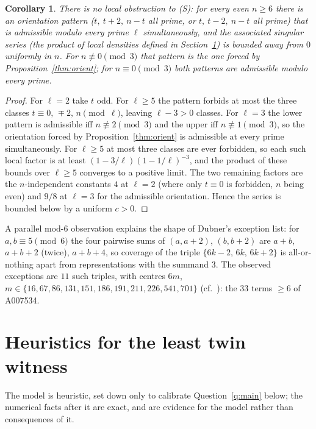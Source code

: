 \documentclass[10pt]{article}
\newtheorem{corollary}{Corollary}
\theoremstyle{definition}
\theoremstyle{remark}
\begin{document}
\begin{corollary}\label{cor:local}
There is no local obstruction to (S): for every even $n \ge 6$ there is
an orientation pattern ($t,\ t+2,\ n-t$ all prime, or $t,\ t-2,\ n-t$
all prime) that is admissible modulo every prime $\ell$ simultaneously,
and the associated singular series (the product of local densities
defined in Section~\ref{sec:heur}) is bounded away from $0$ uniformly in
$n$. For $n \not\equiv 0 \pmod 3$ that pattern is the one forced by
Proposition~\ref{thm:orient}; for $n \equiv 0 \pmod 3$ both patterns are
admissible modulo every prime.
\end{corollary}

\begin{proof}
For $\ell = 2$ take $t$ odd. For $\ell \ge 5$ the pattern forbids at most
the three classes $t \equiv 0,\, \mp 2,\, n \pmod \ell$, leaving
$\ell - 3 > 0$ classes. For $\ell = 3$ the lower pattern is admissible iff
$n \not\equiv 2 \pmod 3$ and the upper iff $n \not\equiv 1 \pmod 3$, so
the orientation forced by Proposition~\ref{thm:orient} is admissible at every
prime simultaneously. For $\ell \ge 5$ at most three classes are ever
forbidden, so each such local factor is at least
$(1 - 3/\ell)(1 - 1/\ell)^{-3}$, and the product of these bounds over
$\ell \ge 5$ converges to a positive limit. The two remaining factors are
the $n$-independent constants $4$ at $\ell = 2$ (where only $t \equiv 0$
is forbidden, $n$ being even) and $9/8$ at $\ell = 3$ for the admissible
orientation. Hence the series is bounded below by a uniform $c > 0$.
\end{proof}

A parallel mod-$6$ observation explains the shape of Dubner's exception list:
for $a, b \equiv 5 \pmod 6$ the four pairwise sums of $(a, a+2)$, $(b, b+2)$
are $a+b$, $a+b+2$ (twice), $a+b+4$, so coverage of the triple
$\{6k-2,\, 6k,\, 6k+2\}$ is all-or-nothing apart from representations with the
summand $3$. The observed exceptions are $11$ such triples, with centres $6m$,
$m \in \{16, 67, 86, 131, 151, 186, 191, 211, 226, 541, 701\}$
(cf.\ \cite{Dubner, OEIS}): the $33$ terms $\ge 6$ of A007534.

\section{Heuristics for the least twin witness}\label{sec:heur}

The model is heuristic, set down only to calibrate Question~\ref{q:main}
below; the numerical facts after it are exact, and are evidence for the model
rather than consequences of it.
\end{document}
